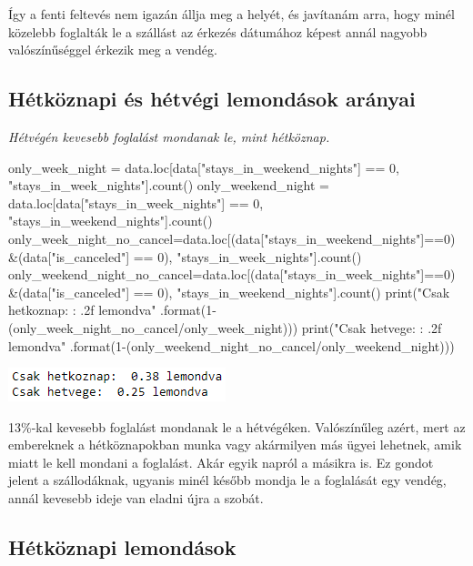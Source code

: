 Így a fenti feltevés nem igazán állja meg a helyét, és javítanám arra, hogy minél közelebb foglalták le a szállást az érkezés dátumához képest annál nagyobb valószínűséggel érkezik meg a vendég.

\subsection{Hétköznapi és hétvégi lemondások arányai}

\textit{Hétvégén kevesebb foglalást mondanak le, mint hétköznap.}
\begin{python}
only_week_night = data.loc[data["stays_in_weekend_nights"] == 0,
"stays_in_week_nights"].count()
only_weekend_night = data.loc[data["stays_in_week_nights"] == 0,
"stays_in_weekend_nights"].count()
only_week_night_no_cancel=data.loc[(data["stays_in_weekend_nights"]==0)
&(data["is_canceled"] == 0), "stays_in_week_nights"].count()
only_weekend_night_no_cancel=data.loc[(data["stays_in_week_nights"]==0)
&(data["is_canceled"] == 0), "stays_in_weekend_nights"].count()
print("Csak hetkoznap: {: .2f} lemondva"
.format(1-(only_week_night_no_cancel/only_week_night)))
print("Csak hetvege: {: .2f} lemondva"
.format(1-(only_weekend_night_no_cancel/only_weekend_night)))
\end{python}
\includegraphics{images/4.fejezet/3.adatelemzes2.PNG}

13\%-kal kevesebb foglalást mondanak le a hétvégéken. Valószínűleg azért, mert az embereknek a hétköznapokban munka vagy akármilyen más ügyei lehetnek, amik miatt le kell mondani a foglalást. Akár egyik napról a másikra is. Ez gondot jelent a szállodáknak, ugyanis minél később mondja le a foglalását egy vendég, annál kevesebb ideje van eladni újra a szobát.

\subsection{Hétköznapi lemondások}

